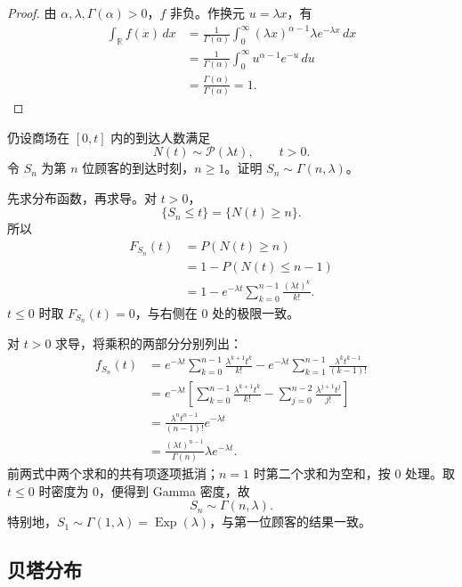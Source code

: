 \begin{proof}
由 $\alpha,\lambda,\Gamma(\alpha)>0$，$f$ 非负。作换元 $u=\lambda x$，有
\[
\begin{aligned}
\int_{\mathbb R}f(x)\,dx
&=\frac1{\Gamma(\alpha)}
\int_0^\infty(\lambda x)^{\alpha-1}\lambda e^{-\lambda x}\,dx\\
&=\frac1{\Gamma(\alpha)}
\int_0^\infty u^{\alpha-1}e^{-u}\,du\\
&=\frac{\Gamma(\alpha)}{\Gamma(\alpha)}=1.
\end{aligned}
\]
\end{proof}

\begin{example}[第 $n$ 位顾客的到达时刻]
仍设商场在 $[0,t]$ 内的到达人数满足
\[
N(t)\sim\mathcal P(\lambda t),\qquad t>0.
\]
令 $S_n$ 为第 $n$ 位顾客的到达时刻，$n\geq1$。证明 $S_n\sim\Gamma(n,\lambda)$。

先求分布函数，再求导。对 $t>0$，
\[
\{S_n\leq t\}=\{N(t)\geq n\}.
\]
所以
\[
\begin{aligned}
F_{S_n}(t)
&=P(N(t)\geq n)\\
&=1-P(N(t)\leq n-1)\\
&=1-e^{-\lambda t}\sum_{k=0}^{n-1}\frac{(\lambda t)^k}{k!}.
\end{aligned}
\]
$t\leq0$ 时取 $F_{S_n}(t)=0$，与右侧在 $0$ 处的极限一致。

对 $t>0$ 求导，将乘积的两部分分别列出：
\[
\begin{aligned}
f_{S_n}(t)
&=e^{-\lambda t}\sum_{k=0}^{n-1}
\frac{\lambda^{k+1}t^k}{k!}
-e^{-\lambda t}\sum_{k=1}^{n-1}
\frac{\lambda^kt^{k-1}}{(k-1)!}\\
&=e^{-\lambda t}\left[
\sum_{k=0}^{n-1}\frac{\lambda^{k+1}t^k}{k!}
-\sum_{j=0}^{n-2}\frac{\lambda^{j+1}t^j}{j!}
\right]\\
&=\frac{\lambda^nt^{n-1}}{(n-1)!}e^{-\lambda t}\\
&=\frac{(\lambda t)^{n-1}}{\Gamma(n)}
\lambda e^{-\lambda t}.
\end{aligned}
\]
前两式中两个求和的共有项逐项抵消；$n=1$ 时第二个求和为空和，按 $0$ 处理。取 $t\leq0$ 时密度为 $0$，便得到 Gamma 密度，故
\[
S_n\sim\Gamma(n,\lambda).
\]
特别地，$S_1\sim\Gamma(1,\lambda)=\operatorname{Exp}(\lambda)$，与第一位顾客的结果一致。
\end{example}

\subsection*{贝塔分布}

